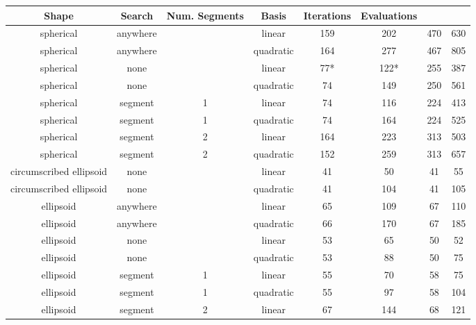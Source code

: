 
\footnotesize
\begin{center}
\begin{longtable}{ c c c c c c c c }
Shape & Search & Num. Segments & Basis & Iterations & Evaluations \\
\hline
\endhead
                spherical &   anywhere &       &     linear & 159  &   202  &  470 &  630 \\
                spherical &   anywhere &       &  quadratic & 164  &   277  &  467 &  805 \\
                spherical &       none &       &     linear &  77* &   122* &  255 &  387 \\
                spherical &       none &       &  quadratic &  74  &   149  &  250 &  561 \\
                spherical &    segment &     1 &     linear &  74  &   116  &  224 &  413 \\
                spherical &    segment &     1 &  quadratic &  74  &   164  &  224 &  525 \\
                spherical &    segment &     2 &     linear & 164  &   223  &  313 &  503 \\
                spherical &    segment &     2 &  quadratic & 152  &   259  &  313 &  657 \\
  circumscribed ellipsoid &       none &       &     linear &  41  &    50  &   41 &   55 \\
  circumscribed ellipsoid &       none &       &  quadratic &  41  &   104  &   41 &  105 \\
                ellipsoid &   anywhere &       &     linear &  65  &   109  &   67 &  110 \\
                ellipsoid &   anywhere &       &  quadratic &  66  &   170  &   67 &  185 \\
                ellipsoid &       none &       &     linear &  53  &    65  &   50 &   52 \\
                ellipsoid &       none &       &  quadratic &  53  &    88  &   50 &   75 \\
                ellipsoid &    segment &     1 &     linear &  55  &    70  &   58 &   75 \\
                ellipsoid &    segment &     1 &  quadratic &  55  &    97  &   58 &  104 \\
                ellipsoid &    segment &     2 &     linear &  67  &   144  &   68 &  121 \\

\end{longtable}
\end{center}
